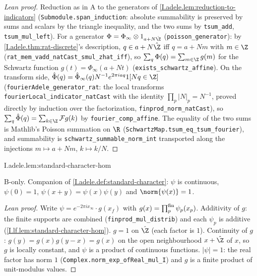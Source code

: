 \begin{proof}[Lean proof]
Reduction as in A to the generators of \cref{I.adele.lem:reduction-to-indicators} (\texttt{Submodule.span\_induction}: absolute summability is preserved by sums and scalars by the triangle inequality, and the two sums by \texttt{tsum\_add}, \texttt{tsum\_mul\_left}). For a generator $\Phi=\Phi_\infty\otimes1_{a+N\hat\Z}$ (\texttt{poisson\_generator}): by \cref{I.adele.thm:rat-discrete}'s description, $q\in a+N\hat\Z$ iff $q=a+Nm$ with $m\in\Z$ (\texttt{rat\_mem\_vadd\_natCast\_smul\_zhat\_iff}), so $\sum_q\Phi(q)=\sum_{m\in\Z}g(m)$ for the Schwartz function $g(t)=\Phi_\infty(a+Nt)$ (\texttt{exists\_schwartz\_affine}). On the transform side, $\hat\Phi(q)=\hat\Phi_\infty(q)N^{-1}e^{2\pi iaq}1[Nq\in\Z]$ (\texttt{fourierAdele\_generator\_rat}: the local transforms \texttt{fourierLocal\_indicator\_natCast} with the identity $\prod_p|N|_p=N^{-1}$, proved directly by induction over the factorization, \texttt{finprod\_norm\_natCast}), so $\sum_q\hat\Phi(q)=\sum_{k\in\Z}\mathcal Fg(k)$ by \texttt{fourier\_comp\_affine}. The equality of the two sums is Mathlib's Poisson summation on $\R$ (\texttt{SchwartzMap.tsum\_eq\_tsum\_fourier}), and summability is \texttt{schwartz\_summable\_norm\_int} transported along the injections $m\mapsto a+Nm$, $k\mapsto k/N$.
\end{proof}

\begin{lemma}
\bonly
{}
\end{lemma}
\begin{tfformal}{I.adele.lem:standard-character-hom}
\begin{tffidelity}
B-only. Companion of \cref{I.adele.def:standard-character}: $\psi$ is continuous, $\psi(0)=1$, $\psi(x+y)=\psi(x)\psi(y)$ and $\norm{\psi(x)}=1$.
\end{tffidelity}
\end{tfformal}
\begin{proof}[Lean proof]
Write $\psi=e^{-2\pi ix_\infty}\cdot g(x_f)$ with $g(x)=\prod^{\rm fin}_p\psi_p(x_p)$. Additivity of $g$: the finite supports are combined (\texttt{finprod\_mul\_distrib}) and each $\psi_p$ is additive (\cref{I.lf.lem:standard-character-hom}). $g=1$ on $\hat\Z$ (each factor is $1$). Continuity of $g$: $g(y)=g(x)g(y-x)=g(x)$ on the open neighbourhood $x+\hat\Z$ of $x$, so $g$ is locally constant, and $\psi$ is a product of continuous functions. $|\psi|=1$: the real factor has norm $1$ (\texttt{Complex.norm\_exp\_ofReal\_mul\_I}) and $g$ is a finite product of unit-modulus values.
\end{proof}

